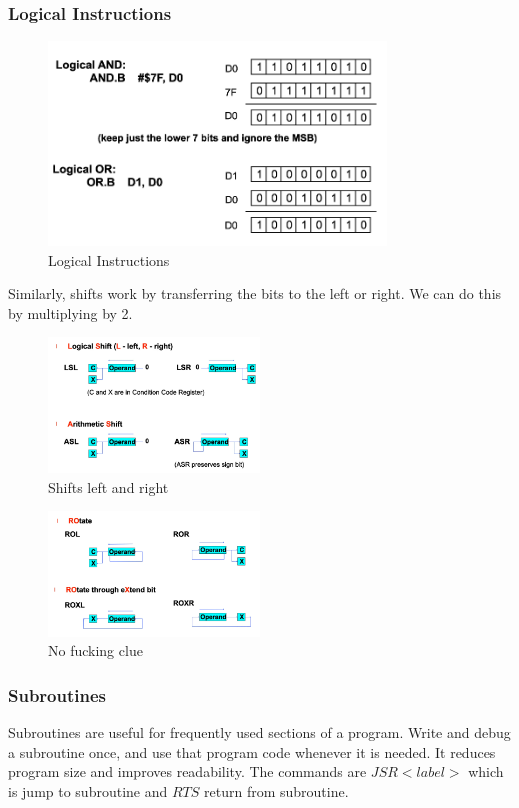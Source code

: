 \documentclass[a4paper]{article}
\theoremstyle{plain}
\theoremstyle{definition}
\theoremstyle{remark}
\begin{document}
\subsubsection{Logical Instructions}
\begin{figure}[H]
	\centering
	\includegraphics[width=0.8\textwidth]{figures/logicalinst.png}
	\caption{Logical Instructions}
	\label{fig:figures-logicalinst-png}
\end{figure}
Similarly, shifts work by transferring the bits to the left or right. We can do this by multiplying by 2. 
\begin{figure}[H]
	\centering
	\includegraphics[width=0.5\textwidth]{figures/logic1.png}
	\caption{Shifts left and right}
	\label{fig:figures-logic1-png}
\end{figure}
\begin{figure}[H]
	\centering
	\includegraphics[width=0.5\textwidth]{figures/logic2.png}
	\caption{No fucking clue}
	\label{fig:figures-logic2-png}
\end{figure}
\subsubsection{Subroutines}
Subroutines are useful for frequently used sections of a program.
Write and debug a subroutine once, and use that program code whenever it is needed. It reduces program size and improves readability. The commands are $JSR <label>$ which is jump to subroutine and $RTS$ return from subroutine.
\end{document}
